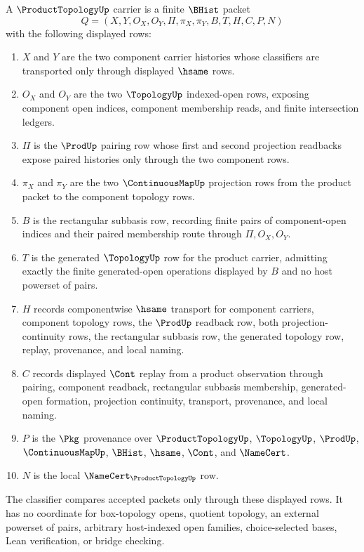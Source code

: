 \begin{definition}
\label{def:product-topology-carrier}
A $\ProductTopologyUp$ carrier is a finite $\BHist$ packet
$$
Q=(X,Y,O_X,O_Y,\Pi,\pi_X,\pi_Y,B,T,H,C,P,N)
$$
with the following displayed rows:
\begin{enumerate}
\item $X$ and $Y$ are the two component carrier histories whose classifiers are transported only through displayed $\hsame$ rows.
\item $O_X$ and $O_Y$ are the two $\TopologyUp$ indexed-open rows, exposing component open indices, component membership reads, and finite intersection ledgers.
\item $\Pi$ is the $\ProdUp$ pairing row whose first and second projection readbacks expose paired histories only through the two component rows.
\item $\pi_X$ and $\pi_Y$ are the two $\ContinuousMapUp$ projection rows from the product packet to the component topology rows.
\item $B$ is the rectangular subbasis row, recording finite pairs of component-open indices and their paired membership route through $\Pi,O_X,O_Y$.
\item $T$ is the generated $\TopologyUp$ row for the product carrier, admitting exactly the finite generated-open operations displayed by $B$ and no host powerset of pairs.
\item $H$ records componentwise $\hsame$ transport for component carriers, component topology rows, the $\ProdUp$ readback row, both projection-continuity rows, the rectangular subbasis row, the generated topology row, replay, provenance, and local naming.
\item $C$ records displayed $\Cont$ replay from a product observation through pairing, component readback, rectangular subbasis membership, generated-open formation, projection continuity, transport, provenance, and local naming.
\item $P$ is the $\Pkg$ provenance over $\ProductTopologyUp$, $\TopologyUp$, $\ProdUp$, $\ContinuousMapUp$, $\BHist$, $\hsame$, $\Cont$, and $\NameCert$.
\item $N$ is the local $\NameCert_{\ProductTopologyUp}$ row.
\end{enumerate}
The classifier compares accepted packets only through these displayed rows. It has no coordinate for box-topology opens, quotient topology, an external powerset of pairs, arbitrary host-indexed open families, choice-selected bases, Lean verification, or bridge checking.
\end{definition}

